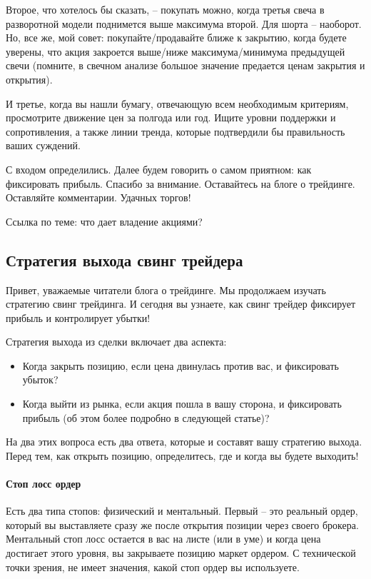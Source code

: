 \documentclass{book}
\begin{document}
Второе, что хотелось бы сказать, – покупать можно, когда третья свеча в разворотной модели поднимется выше максимума второй. Для шорта – наоборот. Но, все же, мой совет: покупайте/продавайте ближе к закрытию, когда будете уверены, что акция закроется выше/ниже максимума/минимума предыдущей свечи (помните, в свечном анализе большое значение предается ценам закрытия и открытия).

И третье, когда вы нашли бумагу, отвечающую всем необходимым критериям, просмотрите движение цен за полгода или год. Ищите уровни поддержки и сопротивления, а также линии тренда, которые подтвердили бы правильность ваших суждений.

С входом определились. Далее будем говорить о самом приятном: как фиксировать прибыль. Спасибо за внимание. Оставайтесь на блоге о трейдинге. Оставляйте комментарии. Удачных торгов!


Ссылка по теме: что дает владение акциями?

\subsection{Стратегия выхода свинг трейдера}

Привет, уважаемые читатели блога о трейдинге. Мы продолжаем изучать стратегию свинг трейдинга. И сегодня вы узнаете, как свинг трейдер фиксирует прибыль и контролирует убытки!

Стратегия выхода из сделки включает два аспекта:
\begin{itemize}
\item     Когда закрыть позицию, если цена двинулась против вас, и фиксировать убыток?
\item     Когда выйти из рынка, если акция пошла в вашу сторона, и фиксировать прибыль (об этом более подробно в следующей статье)?
\end{itemize}

На два этих вопроса есть два ответа, которые и составят вашу стратегию
выхода. Перед тем, как открыть позицию, определитесь, где и когда вы
будете выходить!

\paragraph{Стоп лосс ордер}

Есть два типа стопов: физический и ментальный. Первый – это реальный ордер, который вы выставляете сразу же после открытия позиции через своего брокера. Ментальный стоп лосс остается в вас на листе (или в уме) и когда цена достигает этого уровня, вы закрываете позицию маркет ордером. С технической точки зрения, не имеет значения, какой стоп ордер вы используете.
\end{document}
